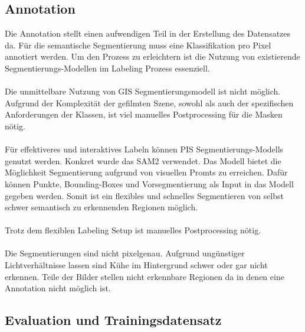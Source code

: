 \documentclass[12pt,DIV=15,BCOR=15mm,twoside,headsepline,abstract=true,listof=totoc,bibliography=totoc]{scrreprt}
\theoremstyle{remark}    %
\begin{document}
    \subsection{Annotation}
    Die Annotation stellt einen aufwendigen Teil in der Erstellung des Datensatzes da. Für die semantische Segmentierung muss eine Klassifikation pro Pixel annotiert 
    werden. Um den Prozess zu erleichtern ist die Nutzung von existierende Segmentierungs-Modellen im Labeling Prozess essenziell.\\\\
    Die unmittelbare Nutzung von \ac{GIS} Segmentierungsmodell ist nicht möglich. Aufgrund der Komplexität der gefilmten Szene,
    sowohl als auch der spezifischen Anforderungen der Klassen, ist viel manuelles Postprocessing für die Masken nötig.\\\\
    Für effektiveres und interaktives Labeln können \ac{PIS} Segmentierungs-Modells genutzt werden. Konkret wurde das SAM2 \cite{ravi2024sam2segmentimages} 
    verwendet. Das Modell 
    bietet die Möglichkeit Segmentierung aufgrund von visuellen Promts zu erreichen. Dafür können Punkte, Bounding-Boxes und Vorsegmentierung als Input in 
    das Modell gegeben werden. Somit ist ein flexibles und schnelles Segmentieren von selbst schwer semantisch zu erkennenden Regionen möglich.\\\\
    Trotz dem flexiblen Labeling Setup ist manuelles Postprocessing nötig.\\\\
    Die Segmentierungen sind nicht pixelgenau. Aufgrund ungünstiger Lichtverhältnisse lassen sind Kühe im Hintergrund schwer oder gar nicht erkennen. Teile
    der Bilder stellen nicht erkennbare Regionen da in denen eine Annotation nicht möglich ist.

    \subsection{Evaluation und Trainingsdatensatz}
\end{document}
